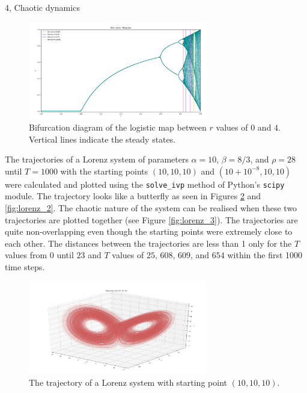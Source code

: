 \documentclass[10pt,a4paper]{article}
\begin{document}
\begin{task}{4, Chaotic dynamics}
\begin{figure}[H]
    \centering
    \includegraphics[width=0.7\textwidth]{../plots/logistic_bif_0-4.png}
    \caption{Bifurcation diagram of the logistic map between $r$ values of $0$ and $4$. Vertical lines indicate the steady states.}
    \label{fig:logistic_bif_04}
\end{figure}

The trajectories of a Lorenz system of parameters $\alpha=10$, $\beta=8/3$, and $\rho=28$ until $T=1000$ with the starting points $(10, 10, 10)$ and $(10+10^{-8}, 10, 10)$ were calculated and plotted using the \texttt{solve\_ivp} method of Python’s \texttt{scipy} module. The trajectory looks like a butterfly as seen in Figures \ref{fig:lorenz_1} and \ref{fig:lorenz_2}. The chaotic nature of the system can be realised when these two trajectories are plotted together (see Figure \ref{fig:lorenz_3}). The trajectories are quite non-overlapping even though the starting points were extremely close to each other. The distances between the trajectories are less than 1 only for the $T$ values from $0$ until $23$ and $T$ values of $25$, $608$, $609$, and $654$ within the first 1000 time steps. \\

\begin{figure}[H]
    \centering
    \includegraphics[width=0.7\textwidth]{../plots/lorenz_1.png}
    \caption{The trajectory of a Lorenz system with starting point $(10, 10, 10)$.}
    \label{fig:lorenz_1}
\end{figure}


\end{task}
\end{document}
